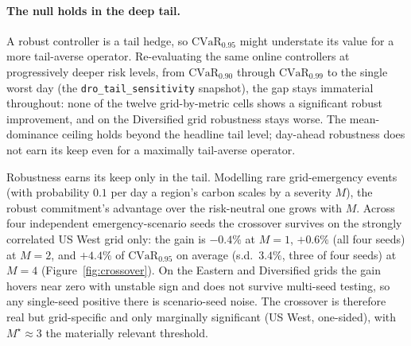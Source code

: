 \documentclass[12pt]{article}
\newcommand{\CVaR}{\mathrm{CVaR}}
\begin{document}
\paragraph{The null holds in the deep tail.} A robust controller is a tail hedge, so
$\CVaR_{0.95}$ might understate its value for a more tail-averse
operator. Re-evaluating the same online controllers at progressively deeper risk
levels, from $\CVaR_{0.90}$ through $\CVaR_{0.99}$ to the single worst day (the
\texttt{dro\_tail\_sensitivity} snapshot), the gap stays immaterial throughout: none
of the twelve grid-by-metric cells shows a significant robust improvement,
and on the Diversified grid robustness stays worse. The mean-dominance ceiling
holds beyond the headline tail level; day-ahead robustness does not earn its keep even
for a maximally tail-averse operator.

Robustness earns its keep only in the tail. Modelling rare grid-emergency events (with
probability $0.1$ per day a region's carbon scales by a severity $M$), the robust
commitment's advantage over the risk-neutral one grows with $M$. Across four
independent emergency-scenario seeds the crossover survives on the strongly correlated
US West grid only: the gain is $-0.4\%$ at $M=1$, $+0.6\%$ (all four seeds) at $M=2$, and
$+4.4\%$ of $\CVaR_{0.95}$ on average (s.d.\ $3.4\%$, three of four seeds) at $M=4$
(Figure~\ref{fig:crossover}). On the Eastern and Diversified grids the gain hovers near
zero with unstable sign and does not survive multi-seed testing, so any single-seed
positive there is scenario-seed noise. The crossover is therefore real but grid-specific
and only marginally significant (US West, one-sided), with $M^\star\approx3$ the
materially relevant threshold.
\end{document}
